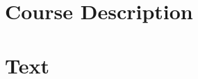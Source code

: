 \documentclass[11pt,article]{memoir}
\begin{document}
\maketitle

\section*{Course Description}

\section*{Text}
\end{document}
